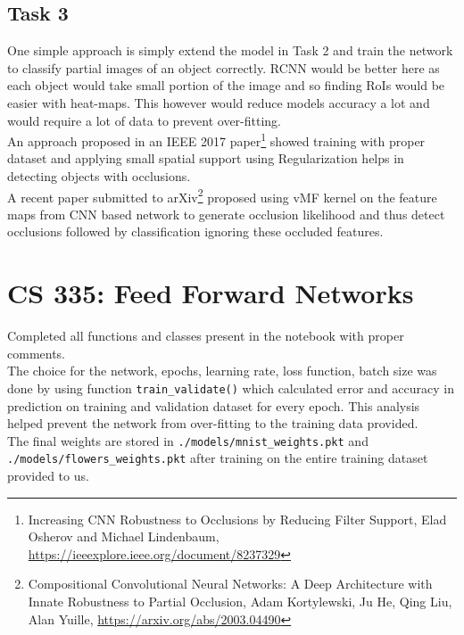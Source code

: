 \documentclass[12pt, fleqn]{article}
\begin{document}
\subsection{Task 3}
One simple approach is simply extend the model in Task 2 and train the network to classify partial images of an object correctly. RCNN would be better here as each object would take small portion of the image and so finding RoIs would be easier with heat-maps. This however would reduce models accuracy a lot and would require a lot of data to prevent over-fitting. \\

An approach proposed in an IEEE 2017 paper\footnote{Increasing CNN Robustness to Occlusions by Reducing Filter Support, Elad Osherov and Michael Lindenbaum, \url{https://ieeexplore.ieee.org/document/8237329}} showed training with proper dataset and applying small spatial support using Regularization helps in detecting objects with occlusions. \\

A recent paper submitted to arXiv\footnote{Compositional Convolutional Neural Networks: A Deep Architecture with Innate Robustness to Partial Occlusion, Adam Kortylewski, Ju He, Qing Liu, Alan Yuille, \url{https://arxiv.org/abs/2003.04490}} proposed using vMF kernel on the feature maps from CNN based network to generate occlusion likelihood and thus detect occlusions followed by classification ignoring these occluded features. \\


\newpage
\section{CS 335: Feed Forward Networks}
Completed all functions and classes present in the notebook with proper comments. \\

The choice for the network, epochs, learning rate, loss function, batch size was done by using function \verb!train_validate()! which calculated error and accuracy in prediction on training and validation dataset for every epoch. This analysis helped prevent the network from over-fitting to the training data provided. \\

The final weights are stored in \verb!./models/mnist_weights.pkt! and \verb!./models/flowers_weights.pkt! after training on the entire training dataset provided to us. \\
\end{document}
